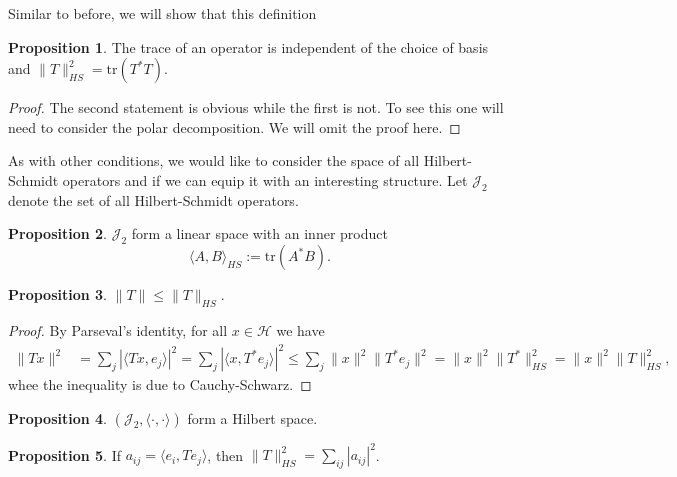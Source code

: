 \documentclass[]{article}
\theoremstyle{definition}
\theoremstyle{definition}
\newtheorem{proposition}{Proposition}[section]
\begin{document}
Similar to before, we will show that this definition 

\begin{proposition}
  The trace of an operator is independent of the choice of basis and 
  \(\|T\|_{HS}^2 = \text{tr}(T^*T)\).
\end{proposition}
\begin{proof}
  The second statement is obvious while the first is not. To see this one 
  will need to consider the polar decomposition. We will omit the proof here.
\end{proof}

As with other conditions, we would like to consider the space of all 
Hilbert-Schmidt operators and if we can equip it with an interesting structure. 
Let \(\mathcal{J}_2\) denote the set of all Hilbert-Schmidt operators. 

\begin{proposition}
  \(\mathcal{J}_2\) form a linear space with an inner product 
  \[\langle A, B \rangle_{HS} := \text{tr}(A^* B).\]
\end{proposition}

\begin{proposition}
  \(\|T\| \le \|T\|_{HS}\).
\end{proposition}
\begin{proof}
  By Parseval's identity, for all \(x \in \mathcal{H}\) we have
  \[\begin{split}
    \|Tx\|^2 & = \sum_j |\langle Tx, e_j\rangle|^2 
      = \sum_j |\langle x, T^* e_j\rangle|^2 \le \sum_j \|x\|^2 \|T^* e_j\|^2
      = \|x\|^2 \|T^*\|^2_{HS} = \|x\|^2 \|T\|^2_{HS},
  \end{split}\]
  whee the inequality is due to Cauchy-Schwarz.
\end{proof}

\begin{proposition}
  \((\mathcal{J}_2, \langle \cdot, \cdot \rangle)\) form a Hilbert space.
\end{proposition}

\begin{proposition}
  If \(a_{ij} = \langle e_i, Te_j\rangle\), then 
  \(\|T\|_{HS}^2 = \sum_{ij} |a_{ij}|^2\).
\end{proposition}
\end{document}
